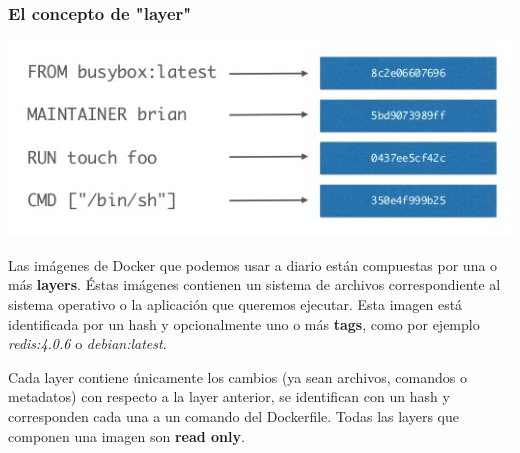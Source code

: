 \documentclass[xcolor={dvipsnames}]{beamer}
\begin{document}
\begin{frame}[fragile]
	\frametitle{El concepto de "layer"}
	\vspace{-0.5cm}
	\justify
	\centering
	\includegraphics[width=.75\textwidth]{assets/layers3.png}
	\vspace{-0.5cm}
	\begin{multicols}{2}
	\justify
		\begin{spacing}{0.8}
		\small Las imágenes de Docker que podemos usar a diario están compuestas por una o más \textbf{layers}. Éstas imágenes contienen un sistema de archivos correspondiente al sistema operativo o la aplicación que queremos ejecutar. Esta imagen está identificada por un hash y opcionalmente uno o más \textbf{tags}, como por ejemplo \textit{redis:4.0.6} o \textit{debian:latest}.

		\columnbreak

		\small Cada layer contiene únicamente los cambios (ya sean archivos, comandos o metadatos) con respecto a la layer anterior, se identifican con un hash y corresponden cada una a un comando del Dockerfile. Todas las layers que componen una imagen son \textbf{read only}.

		\end{spacing}
	\end{multicols}
\end{frame}
\end{document}
